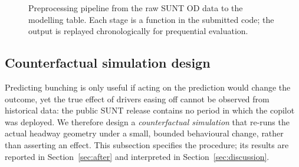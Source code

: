 \documentclass[11pt,a4paper]{article}
\begin{document}
\begin{figure}[htbp]
\centering
{}
\caption{Preprocessing pipeline from the raw SUNT OD data to the modelling table. Each stage is a
function in the submitted code; the output is replayed chronologically for prequential evaluation.}
\label{fig:pipeline}
\end{figure}

\subsection{Counterfactual simulation design}
\label{sec:simdesign}

Predicting bunching is only useful if acting on the prediction would change the outcome, yet the
true effect of drivers easing off cannot be observed from historical data: the public SUNT release
contains no period in which the copilot was deployed. We therefore design a \emph{counterfactual
simulation} that re-runs the actual headway geometry under a small, bounded behavioural change,
rather than asserting an effect. This subsection specifies the procedure; its results are reported
in Section~\ref{sec:after} and interpreted in Section~\ref{sec:discussion}.
\end{document}
